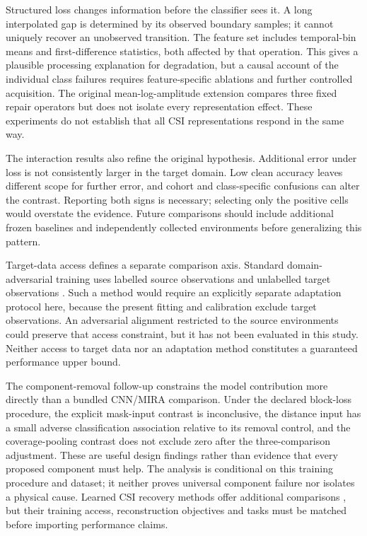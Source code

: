 \documentclass[a4paper,11pt,fleqn]{mira-author}
\begin{document}
Structured loss changes information before the classifier sees it. A long interpolated gap is determined by its observed boundary samples; it cannot uniquely recover an unobserved transition. The feature set includes temporal-bin means and first-difference statistics, both affected by that operation. This gives a plausible processing explanation for degradation, but a causal account of the individual class failures requires feature-specific ablations and further controlled acquisition. The original mean-log-amplitude extension compares three fixed repair operators but does not isolate every representation effect. These experiments do not establish that all CSI representations respond in the same way.

The interaction results also refine the original hypothesis. Additional error under loss is not consistently larger in the target domain. Low clean accuracy leaves different scope for further error, and cohort and class-specific confusions can alter the contrast. Reporting both signs is necessary; selecting only the positive cells would overstate the evidence. Future comparisons should include additional frozen baselines and independently collected environments before generalizing this pattern.

Target-data access defines a separate comparison axis. Standard domain-adversarial training uses labelled source observations and unlabelled target observations \cite{ganin2016}. Such a method would require an explicitly separate adaptation protocol here, because the present fitting and calibration exclude target observations. An adversarial alignment restricted to the source environments could preserve that access constraint, but it has not been evaluated in this study. Neither access to target data nor an adaptation method constitutes a guaranteed performance upper bound.

The component-removal follow-up constrains the model contribution more directly than a bundled CNN/MIRA comparison. Under the declared block-loss procedure, the explicit mask-input contrast is inconclusive, the distance input has a small adverse classification association relative to its removal control, and the coverage-pooling contrast does not exclude zero after the three-comparison adjustment. These are useful design findings rather than evidence that every proposed component must help. The analysis is conditional on this training procedure and dataset; it neither proves universal component failure nor isolates a physical cause. Learned CSI recovery methods offer additional comparisons \cite{zhao2024csibert,zhao2026csibert2}, but their training access, reconstruction objectives and tasks must be matched before importing performance claims.
\end{document}
